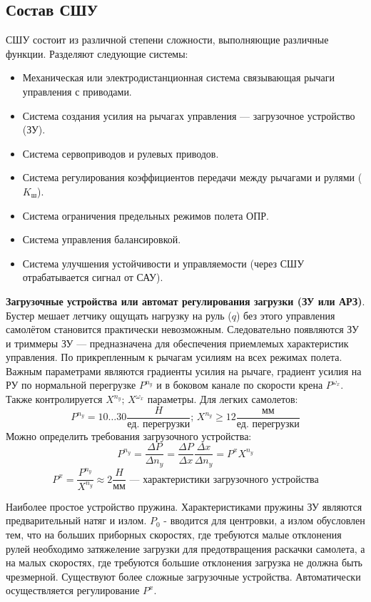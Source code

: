 \documentclass{article}
\begin{document}
\subsection{Состав СШУ}
СШУ состоит из различной степени сложности, выполняющие различные функции.
Разделяют следующие системы:
\begin{itemize}
	\item Механическая или электродистанционная система связывающая рычаги
	      управления с приводами.
	\item Система создания усилия на рычагах управления --- загрузочное
	      устройство (ЗУ).
	\item Система сервоприводов и рулевых приводов.
	\item Система регулирования коэффициентов передачи между рычагами и рулями
	      ($K_\text{ш}$).
	\item Система ограничения предельных режимов полета ОПР.
	\item Система управления балансировкой.
	\item Система улучшения устойчивости и управляемости (через СШУ
	      отрабатывается сигнал от САУ).
\end{itemize}
\textbf{Загрузочные устройства или автомат регулирования загрузки (ЗУ или
	АРЗ)}. Бустер мешает летчику ощущать нагрузку на руль ($q$) без этого
управления самолётом становится практически невозможным. Следовательно
появляются ЗУ и триммеры
ЗУ --- предназначена для обеспечения приемлемых характеристик управления. По
прикрепленным к рычагам усилиям на всех режимах полета. Важным параметрами
являются градиенты усилия на рычаге, градиент усилия на РУ по нормальной
перегрузке $P^{n_y}$ и в боковом канале по скорости крена $P^{\omega_x}$. Также
контролируется $X^{n_y}; \, X^{\omega_x}$ параметры. Для легких самолетов:
\[
	P^{n_y} =10 \dots 30 \frac{H}{\text{ед. перегрузки}}; \, X^{n_y} \ge 12
	\frac{\text{мм}}{\text{ед. перегрузки}}
\]
Можно определить требования загрузочного устройства:
\[
	P^{n_y} = \frac{\Delta P}{\Delta n_y} = \frac{\Delta P}{\Delta x}
	\frac{\Delta x}{\Delta n_y} = P^{x} X^{n_y}
\]
\[
	P^{x} = \frac{P^{n_y}}{X^{n_y}} \approx 2 \frac{H}{\text{мм}} \text{ ---
		характеристики загрузочного устройства}
\]

Наиболее простое устройство пружина.
Характеристиками пружины ЗУ являются предварительный натяг и излом. $P_0$ -
вводится для центровки, а излом обусловлен тем, что на больших приборных
скоростях, где требуются малые отклонения рулей необходимо затяжеление загрузки
для предотвращения раскачки самолета, а на малых скоростях, где требуются
большие отклонения загрузка не должна быть чрезмерной. Существуют более сложные
загрузочные устройства. Автоматически осуществляется регулирование $P^{x}$.
\end{document}

